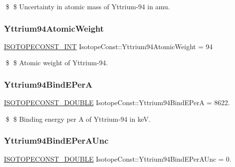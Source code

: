 \$ \$ Uncertainty in atomic mass of Yttrium-\/94 in amu. \mbox{\label{group___isotope_const-_yttrium-_y94_ga33c462cbc57cb4374653e5cbed86a90c}} 
\subsubsection{\texorpdfstring{Yttrium94\+Atomic\+Weight}{Yttrium94AtomicWeight}}
{\footnotesize\ttfamily \mbox{\hyperlink{group___isotope_const-_macros_ga5f18360b3e99483a35c32d789e62621c}{I\+S\+O\+T\+O\+P\+E\+C\+O\+N\+S\+T\+\_\+\+I\+NT}} Isotope\+Const\+::\+Yttrium94\+Atomic\+Weight = 94}

\$ \$ Atomic weight of Yttrium-\/94. \mbox{\label{group___isotope_const-_yttrium-_y94_ga14187fca18501551753f5c8ab6b6a689}} 
\subsubsection{\texorpdfstring{Yttrium94\+Bind\+E\+PerA}{Yttrium94BindEPerA}}
{\footnotesize\ttfamily \mbox{\hyperlink{group___isotope_const-_macros_ga8f45a7272ce02c0b4c65c44636ed719a}{I\+S\+O\+T\+O\+P\+E\+C\+O\+N\+S\+T\+\_\+\+D\+O\+U\+B\+LE}} Isotope\+Const\+::\+Yttrium94\+Bind\+E\+PerA = 8622.}

\$ \$ Binding energy per A of Yttrium-\/94 in keV. \mbox{\label{group___isotope_const-_yttrium-_y94_ga0828ec26833660969073deafdb5849fe}} 
\subsubsection{\texorpdfstring{Yttrium94\+Bind\+E\+Per\+A\+Unc}{Yttrium94BindEPerAUnc}}
{\footnotesize\ttfamily \mbox{\hyperlink{group___isotope_const-_macros_ga8f45a7272ce02c0b4c65c44636ed719a}{I\+S\+O\+T\+O\+P\+E\+C\+O\+N\+S\+T\+\_\+\+D\+O\+U\+B\+LE}} Isotope\+Const\+::\+Yttrium94\+Bind\+E\+Per\+A\+Unc = 0.}

